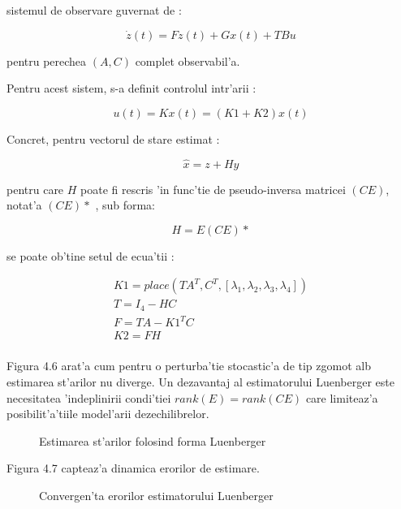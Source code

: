 \documentclass[12pt,a4paper,twoside]{report}
\begin{document}
sistemul de observare guvernat de \cite{luen2}:

\begin{equation}
    \dot z(t) = Fz(t) + Gx(t) + TBu
\end{equation}

pentru perechea $(A,C)$ complet observabil'a.

Pentru acest sistem, s-a definit controlul intr'arii \cite{luen2}:

\begin{equation}
    u(t) = Kx(t) = (K1 + K2) x(t)
\end{equation}

Concret, pentru vectorul de stare estimat \cite{Decuplare}:

\begin{equation}
    \hat x = z + Hy
\end{equation}

pentru care $H$ poate fi rescris 'in func'tie de pseudo-inversa matricei $(CE)$, notat'a $(CE)*$ \cite{Decuplare}, sub  forma:

\begin{equation}
    H = E (CE)*
\end{equation}

se poate ob'tine setul de ecua'tii \cite{Decuplare}:

\begin{gather}
        K1 = place({TA}^T, {C}^T, [\lambda_1,\lambda_2,\lambda_3,\lambda_4]) \\
        T = I_4 - HC \\
        F = TA - K1^T C \\
        K2 = FH\\
\end{gather}

Figura 4.6 arat'a cum pentru o perturba'tie stocastic'a de tip zgomot alb estimarea st'arilor nu diverge. Un dezavantaj al estimatorului Luenberger este necesitatea 'indeplinirii condi'tiei $rank(E) = rank(CE)$ \cite{Decuplare} care limiteaz'a posibilit'a'tiile model'arii dezechilibrelor.

\begin{figure}[h]
  \hspace*{-4cm}
  
  \caption{Estimarea st'arilor folosind forma Luenberger}
\end{figure}

Figura 4.7 capteaz'a dinamica erorilor de estimare.

\begin{figure}[h]
\centering
  
  \caption{Convergen'ta erorilor estimatorului Luenberger}
\end{figure}
\end{document}
